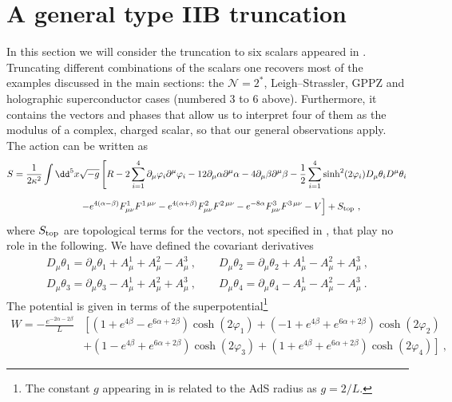 \section{A general type IIB truncation}\label{app:trunc}

In this section we will consider the truncation to six scalars appeared in \cite{Khavaev:2000gb,Bobev:2010de}. Truncating different combinations of the scalars one recovers most of the examples discussed in the main sections: the $\mathcal{N}=2^*$, Leigh--Strassler, GPPZ and holographic superconductor cases (numbered 3 to 6 above). Furthermore, it contains the vectors and phases that allow us to interpret four of them as the modulus of a complex, charged scalar, so that our general observations apply. The action can be written as 
\begin{align}
S=\frac{1}{2\kappa^2}\int\dd^5x & \sqrt{-g}\left[R-2\sum_{i=1}^4\partial_\mu\varphi_i\partial^\mu\varphi_i-12\partial_\mu\alpha\partial^\mu\alpha-4\partial_\mu\beta\partial^\mu\beta-\frac12\sum_{i=1}^4\sinh^2(2\varphi_i)D_\mu\theta_i D^\mu\theta_i\right.\nonumber\\[2mm]
&\left.-e^{4(\alpha-\beta)}F_{\mu\nu}^1F^{1\,\mu\nu}-e^{4(\alpha+\beta)}F_{\mu\nu}^2F^{2\,\mu\nu}-e^{-8\alpha}F_{\mu\nu}^3F^{3\,\mu\nu}-V\right]+S_{\rm top}\ ,
\end{align}
where $S_{\rm top}$ are topological terms for the vectors, not specified in \cite{Bobev:2010de}, that play no role in the following. We have defined the covariant derivatives
\begin{align}
D_\mu\theta_1=\partial_\mu\theta_1+A_\mu^1+A_\mu^2-A_\mu^3\ ,\qquad D_\mu\theta_2=\partial_\mu\theta_2+A_\mu^1-A_\mu^2+A_\mu^3\ ,\nonumber\\[2mm]
D_\mu\theta_3=\partial_\mu\theta_3-A_\mu^1+A_\mu^2+A_\mu^3\ ,\qquad D_\mu\theta_4=\partial_\mu\theta_4-A_\mu^1-A_\mu^2-A_\mu^3\ .
\end{align} 
The potential is given in terms of the superpotential\footnote{The constant $g$ appearing in \cite{Khavaev:2000gb,Bobev:2010de} is related to the AdS radius as $g=2/L$.} 
\begin{align}
W=-\frac{e^{-2\alpha-2\beta}}{L}&\left[\left(1+e^{4\beta}-e^{6\alpha+2\beta}\right)\cosh(2\varphi_1)+\left(-1+e^{4\beta}+e^{6\alpha+2\beta}\right)\cosh(2\varphi_2)\right.\nonumber\\[2mm]
&\left.+\left(1-e^{4\beta}+e^{6\alpha+2\beta}\right)\cosh(2\varphi_3)+\left(1+e^{4\beta}+e^{6\alpha+2\beta}\right)\cosh(2\varphi_4)\right]\ ,
\end{align}
